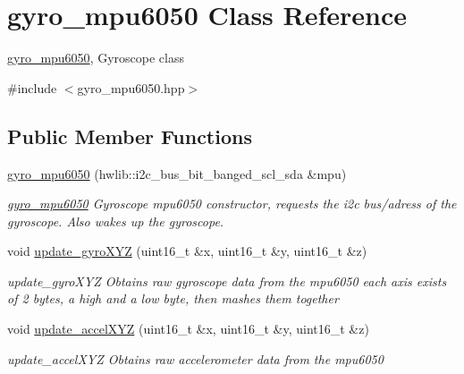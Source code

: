\hypertarget{classgyro__mpu6050}{}\section{gyro\+\_\+mpu6050 Class Reference}
\label{classgyro__mpu6050}


\hyperlink{classgyro__mpu6050}{gyro\+\_\+mpu6050}, Gyroscope class  




{\ttfamily \#include $<$gyro\+\_\+mpu6050.\+hpp$>$}

\subsection*{Public Member Functions}
\begin{DoxyCompactItemize}
\item 
\mbox{\label{classgyro__mpu6050_ab5d528e6eb3d387b5afbd73f911c948f}} 
\hyperlink{classgyro__mpu6050_ab5d528e6eb3d387b5afbd73f911c948f}{gyro\+\_\+mpu6050} (hwlib\+::i2c\+\_\+bus\+\_\+bit\+\_\+banged\+\_\+scl\+\_\+sda \&mpu)
\begin{DoxyCompactList}\small\item\em \hyperlink{classgyro__mpu6050}{gyro\+\_\+mpu6050} Gyroscope mpu6050 constructor, requests the i2c bus/adress of the gyroscope. Also wakes up the gyroscope. \end{DoxyCompactList}\item 
\mbox{\label{classgyro__mpu6050_a8f2f1da85b970bf7e9f564d80aeef062}} 
void \hyperlink{classgyro__mpu6050_a8f2f1da85b970bf7e9f564d80aeef062}{update\+\_\+gyro\+X\+YZ} (uint16\+\_\+t \&x, uint16\+\_\+t \&y, uint16\+\_\+t \&z)
\begin{DoxyCompactList}\small\item\em update\+\_\+gyro\+X\+YZ Obtains raw gyroscope data from the mpu6050 each axis exists of 2 bytes, a high and a low byte, then mashes them together \end{DoxyCompactList}\item 
\mbox{\label{classgyro__mpu6050_a8700adda96c44677ae97c53f9bf9808d}} 
void \hyperlink{classgyro__mpu6050_a8700adda96c44677ae97c53f9bf9808d}{update\+\_\+accel\+X\+YZ} (uint16\+\_\+t \&x, uint16\+\_\+t \&y, uint16\+\_\+t \&z)
\begin{DoxyCompactList}\small\item\em update\+\_\+accel\+X\+YZ Obtains raw accelerometer data from the mpu6050 \end{DoxyCompactList}\item 

\end{DoxyCompactItemize}
